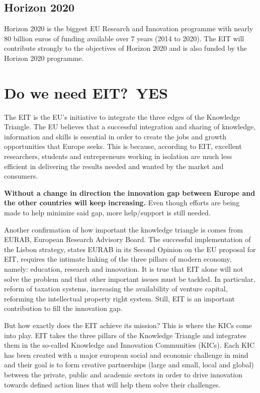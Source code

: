 \documentclass[11pt,a4paper,oneside,twocolumn]{IEEEtran}
\begin{document}
\subsection{Horizon 2020}
Horizon 2020 is the biggest EU Research and Innovation programme with nearly 80 billion euros of funding available over 7 years (2014 to 2020)\cite{3_6}. The EIT will contribute strongly to the objectives of Horizon 2020 and is also funded by the Horizon 2020 programme\cite{3_7}.


\section{Do we need EIT?\ YES}
The EIT is the EU’s initiative to integrate the three edges of the Knowledge Triangle. The EU believes that a successful integration and sharing of knowledge, information and skills is essential in order to create the jobs and growth opportunities that Europe seeks. This is because, according to EIT, excellent researchers, students and entrepreneurs working in isolation are much less efficient in delivering the results needed and wanted by the market and consumers.

\textbf{Without a change in direction the innovation gap between Europe and the other countries will keep increasing.} Even though efforts are being made to help minimize said gap, more help/support is still needed.

Another confirmation of how important the knowledge triangle is comes from EURAB, European Research Advisory Board. The successful implementation of the Lisbon strategy, states EURAB in its Second Opinion on the EU proposal for EIT, requires the intimate linking of the three pillars of modern economy, namely: education, research and innovation. It is true that EIT alone will not solve the problem and that other important issues must be tackled. In particular, reform of taxation systems, increasing the availability of venture capital, reforming the intellectual property right system. Still, EIT is an important contribution to fill the innovation gap\cite{4_1}.


But how exactly does the EIT achieve its mission? This is where the KICs come into play. EIT takes the three pillars of the Knowledge Triangle and integrates them in the so-called Knowledge and Innovation Communities (KICs). Each KIC has been created with a major european social and economic challenge in mind and their goal is to form creative partnerships (large and small, local and global) between the private, public and academic sectors in order to drive innovation towards defined action lines that will help them solve their challenges.
\end{document}
